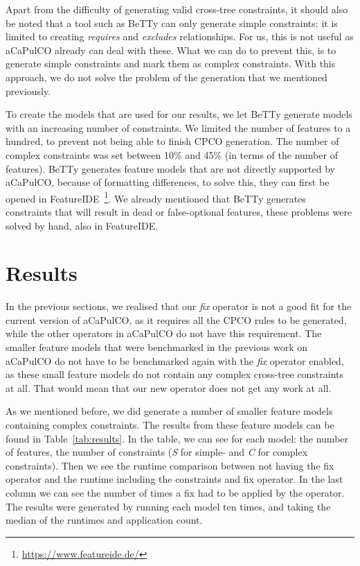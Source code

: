 Apart from the difficulty of generating valid cross-tree constraints, it should
also be noted that a tool such as BeTTy can only generate simple constraints: it
is limited to creating \emph{requires} and \emph{excludes} relationships. For us,
this is not useful as aCaPulCO already can deal with these.
What we can do to prevent this, is to generate simple constraints and mark them
as complex constraints. With this approach, we do not solve the problem of the
generation that we mentioned previously.

To create the models that are used for our results, we let BeTTy generate models
with an increasing number of constraints. We limited the number of features to
a hundred, to prevent not being able to finish CPCO generation. The number of
complex constraints was set between 10\% and 45\% (in terms of the number of features).
BeTTy generates feature models that are not directly supported by aCaPulCO, because
of formatting differences, to solve this, they can first be opened in FeatureIDE~\footnote{\url{https://www.featureide.de/}}.
We already mentioned that BeTTy generates constraints that will result in dead
or false-optional features, these problems were solved by hand, also in FeatureIDE.

\section{Results}\label{sec:results}
In the previous sections, we realised that our \emph{fix} operator is not a good
fit for the current version of aCaPulCO, as it requires all the CPCO rules to be
generated, while the other operators in aCaPulCO do not have this requirement.
The smaller feature models that were benchmarked in the previous work on aCaPulCO
do not have to be benchmarked again with the \emph{fix} operator enabled, as these
small feature models do not contain any complex cross-tree constraints at all. That
would mean that our new operator does not get any work at all.

As we mentioned before, we did generate a number of smaller feature models containing
complex constraints. The results from these feature models can be found in Table~\ref{tab:results}.
In the table, we can see for each model: the number of features, the number of constraints
(\emph{S} for simple- and \emph{C} for complex constraints). Then we see the runtime
comparison between not having the fix operator and the runtime including the constraints
and fix operator. In the last column we can see the number of times a fix had to be
applied by the operator. The results were generated by running each model ten times, and taking the median of
the runtimes and application count.

